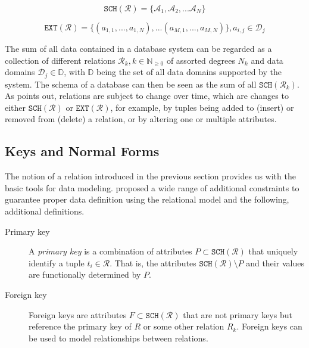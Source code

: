 \begin{equation}
    \mathtt{SCH}(\mathcal{R}) = \lbrace \mathcal{A}_1, \mathcal{A}_2, ... \mathcal{A}_N \rbrace
\end{equation}

\begin{equation}
    \mathtt{EXT}(\mathcal{R}) = \lbrace (a_{1,1}, ..., a_{1,N}), ... (a_{M,1}, ..., a_{M,N})\rbrace, a_{i,j} \in \mathcal{D}_j 
\end{equation}

The sum of all data contained in a database system can be regarded as a collection of different relations $\mathcal{R}_k, k \in \mathbb{N}_{\geq 0}$ of assorted degrees $N_k$ and data domains $\mathcal{D}_j \in \mathbb{D}$, with $\mathbb{D}$ being the set of all data domains supported by the system. The schema of a database can then be seen as the sum of all $\mathtt{SCH}(\mathcal{R}_k)$. As \cite{Codd:1970Relational} points out, relations are subject to change over time, which are changes to either $\mathtt{SCH}(\mathcal{R})$ or $\mathtt{EXT}(\mathcal{R})$, for example, by tuples being added to (insert) or removed from (delete) a relation, or by altering one or multiple attributes.


\subsection{Keys and Normal Forms}

The notion of a relation introduced in the previous section provides us with the basic tools for data modeling. \cite{Codd:1970Relational} proposed a wide range of additional constraints to guarantee proper data definition using the relational model and the following, additional definitions. 

\begin{description}
    \item[Primary key] A \emph{primary key} is a combination of attributes $P \subset \mathtt{SCH}(\mathcal{R})$ that uniquely identify a tuple $t_i \in \mathcal{R}$. That is, the attributes $\mathtt{SCH}(\mathcal{R}) \setminus P$ and their values are functionally determined by $P$.
    \item[Foreign key] Foreign keys are attributes $F \subset \mathtt{SCH}(\mathcal{R})$ that are not primary keys but reference the primary key of $R$ or some other relation $R_k$. Foreign keys can be used to model relationships between relations.
\end{description}

